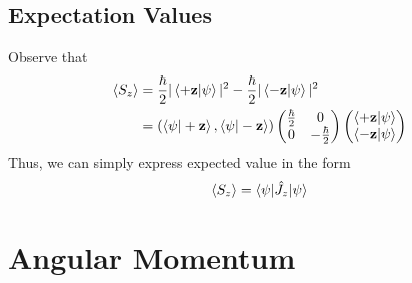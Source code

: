 \documentclass{report}
\begin{document}
\section{Expectation Values}
Observe that
\begin{align*}
	\langle S_z \rangle &= \frac{\hbar}{2} |\braket{+ \mathbf z | \psi }|^2 - \frac{\hbar}{2} |\braket{- \mathbf z | \psi}|^2\\
			    &=\left( \braket{\psi | + \mathbf z}, \braket{\psi | - \mathbf z} \right) \begin{pmatrix} \frac{\hbar}{2} & 0 \\ 0 & -\frac{\hbar}{2}  \end{pmatrix} \begin{pmatrix} \braket{+ \mathbf z | \psi} \\ \braket{- \mathbf z | \psi} \end{pmatrix}  
\end{align*}
Thus, we can simply express expected value in the form
\[
\langle S_z \rangle = \braket{\psi | \hat J_z | \psi}
\]
\chapter{Angular Momentum}
\end{document}
